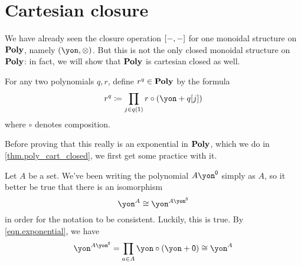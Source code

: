 \documentclass[Book-Poly]{subfiles}
\begin{document}
\section{Cartesian closure}

We have already seen the closure operation $[-,-]$ for one monoidal structure on $\mathbf{Poly}$, namely $(\yon,\otimes)$.
But this is not the only closed monoidal structure on $\mathbf{Poly}$: in fact, we will show that $\mathbf{Poly}$ is cartesian closed as well.

For any two polynomials $q,r$, define $r^q\in\mathbf{Poly}$ by the formula
\begin{equation}\label{eqn.exponential}
  r^q\coloneqq\prod_{j\in q(\1)}r\circ(\yon+q[j])
\end{equation}
where $\circ$ denotes composition.

Before proving that this really is an exponential in $\mathbf{Poly}$, which we do in \cref{thm.poly_cart_closed}, we first get some practice with it.

\begin{example}
Let $A$ be a set. We've been writing the polynomial $A\yon^\0$ simply as $A$, so it better be true that there is an isomorphism 
\[
    \yon^A \iso \yon^{A\yon^\0}
\]
in order for the notation to be consistent. 
Luckily, this is true.
By \eqref{eqn.exponential}, we have
\[
    \yon^{A\yon^\0} = \prod_{a\in A} \yon \circ (\yon+\0) \iso \yon^A
\]
\end{example}
\end{document}
